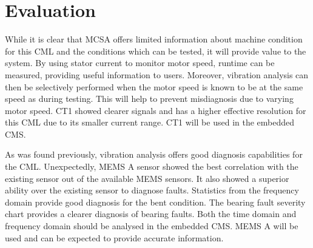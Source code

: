 \section{Evaluation}

While it is clear that MCSA offers limited information about machine condition for this CML and the conditions which can be tested, it will provide value to the system.
By using stator current to monitor motor speed, runtime can be measured, providing useful information to users.
Moreover, vibration analysis can then be selectively performed when the motor speed is known to be at the same speed as during testing.
This will help to prevent misdiagnosis due to varying motor speed.
CT1 showed clearer signals and has a higher effective resolution for this CML due to its smaller current range.
CT1 will be used in the embedded CMS.
\par

As was found previously, vibration analysis offers good diagnosis capabilities for the CML.
Unexpectedly, MEMS A sensor showed the best correlation with the existing sensor out of the available MEMS sensors.
It also showed a superior ability over the existing sensor to diagnose faults.
Statistics from the frequency domain provide good diagnosis for the bent condition.
The bearing fault severity chart provides a clearer diagnosis of bearing faults.
Both the time domain and frequency domain should be analysed in the embedded CMS.
MEMS A will be used and can be expected to provide accurate information.